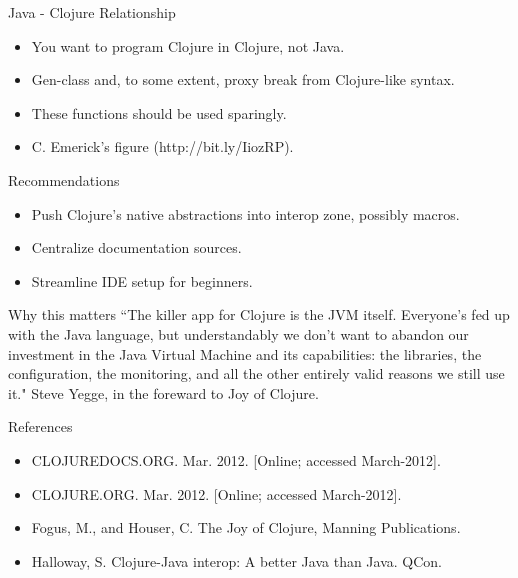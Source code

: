 \documentclass[xcolor=dvipsnames]{beamer}
\begin{document}
	\begin{frame}{Java - Clojure Relationship}
	\begin{itemize}	
	\item You want to program Clojure in Clojure, not Java.
	\item Gen-class and, to some extent, proxy break from Clojure-like syntax.
	\item These functions should be used sparingly.
	\item C. Emerick's figure (http://bit.ly/IiozRP).
	\end{itemize}
	\end{frame}
	
	\begin{frame}{Recommendations}
	\begin{itemize}
		\item Push Clojure's native abstractions into interop zone, possibly macros.
		\item Centralize documentation sources.
		\item Streamline IDE setup for beginners.
	\end{itemize}
	\end{frame}
	
	\begin{frame}{Why this matters}
		``The killer app for Clojure is the JVM itself. Everyone's fed up with the Java language, but understandably we don't want to abandon our investment in the Java Virtual Machine and its capabilities: the libraries, the configuration, the monitoring, and all the other entirely valid reasons we still use it."  
		\newline
		Steve Yegge, in the foreward to Joy of Clojure.
	\end{frame}
	
	\begin{frame}{References}
	\begin{itemize}
	\item CLOJUREDOCS.ORG. Mar. 2012. [Online; accessed March-2012].
	\item CLOJURE.ORG. Mar. 2012. [Online; accessed March-2012].
	\item Fogus, M., and Houser, C. The Joy of Clojure, Manning Publications.
	\item Halloway, S. Clojure-Java interop: A better Java than Java. QCon.
	\end{itemize}
	\end{frame}
\end{document}
